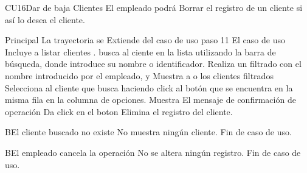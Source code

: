\begin{UseCase}{CU16}{Dar de baja Clientes}{
	El empleado podrá Borrar el registro de un cliente si así lo desea el cliente.
	}
	\end{UseCase}
	\begin{UCtrayectoria}{Principal}
		\UCpaso La trayectoria se Extiende del caso de uso  paso 11
		\UCpaso El caso de uso Incluye a listar clientes . 
		\UCpaso [\UCactor] busca al ciente en la lista utilizando la barra de búsqueda, donde introduce su nombre o identificador.		
		\UCpaso Realiza un filtrado con el nombre introducido por el empleado, y Muestra a o los clientes filtrados 
		\UCpaso[\UCactor] Selecciona al cliente que busca haciendo click al botón  que se encuentra en la misma fila en la columna de opciones.
		\UCpaso Muestra El mensaje de confirmación de operación
		\UCpaso [\UCactor] Da click en el boton 
		\UCpaso Elimina el registro del cliente.
	\end{UCtrayectoria}

\begin{UCtrayectoriaA}{B}{El cliente buscado no existe}
			\UCpaso No muestra ningún cliente.
			\UCpaso Fin de caso de uso.
		\end{UCtrayectoriaA}
\begin{UCtrayectoriaA}{B}{El empleado cancela la operación}
			\UCpaso No se altera ningún registro.
			\UCpaso Fin de caso de uso.
		\end{UCtrayectoriaA}		


